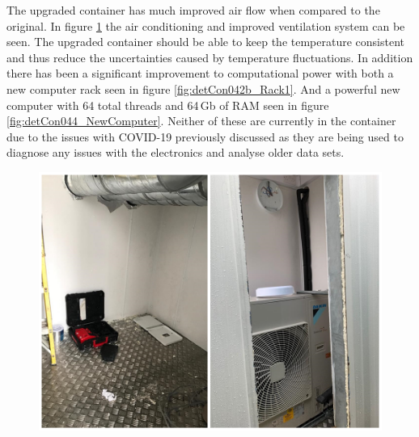 The upgraded container has much improved air flow when compared to the original. 
In figure  \ref{fig:detCon035b_ContainerAirCon} the air conditioning and improved ventilation system can be seen. The upgraded container should be able to keep the temperature consistent and thus reduce the uncertainties caused by temperature fluctuations. In addition there has been a significant improvement to computational power with both a new computer rack seen in figure \ref{fig:detCon042b_Rack1}. And a powerful new computer with 64 total threads and 64\,Gb of RAM seen in figure \ref{fig:detCon044_NewComputer}. Neither of these are currently in the container due to the issues with COVID-19 previously discussed as they are being used to diagnose any issues with the electronics and analyse older data sets.  

\begin{figure}[htbp]
\centering
\includegraphics[width=0.7\linewidth]{Chapter3/Figs/Raster/detCon035b_ContainerAirCon.png}
\label{fig:detCon035b_ContainerAirCon}
\end{figure}



